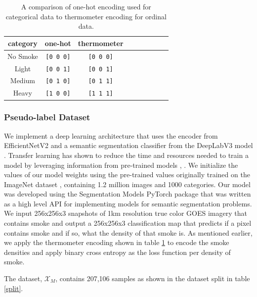 \begin{table}[h] 
    \caption{A comparison of one-hot encoding used for categorical data to thermometer encoding for ordinal data.}\label{therm}
    \centering
    \begin{tabular}{ccccrrcrc}
        \toprule
        category & one-hot & thermometer \\
        \midrule
        No Smoke & \texttt{[0 0 0]} & \texttt{[0 0 0]} \\
        Light  & \texttt{[0 0 1]} & \texttt{[0 0 1]} \\
        Medium & \texttt{[0 1 0]} & \texttt{[0 1 1]} \\
        Heavy  & \texttt{[1 0 0]} & \texttt{[1 1 1]} \\
        \bottomrule
    \end{tabular}
\end{table}

\subsubsection{Pseudo-label Dataset} 

We implement a deep learning architecture that uses the encoder from EfficientNetV2 \cite{efficientnetv2} and a semantic segmentation classifier from the DeepLabV3 model \cite{deeplab}. Transfer learning has shown to reduce the time and resources needed to train a model by leveraging information from pre-trained models \cite{transfer}, \cite{transfer2}. We initialize the values of our model weights using the pre-trained values originally trained on the ImageNet dataset \cite{imgnet}, containing 1.2 million images and 1000 categories. Our model was developed using the Segmentation Models PyTorch package \cite{semantic} that was written as a high level API for implementing models for semantic segmentation problems. We input 256x256x3 snapshots of 1km resolution true color GOES imagery that contains smoke and output a 256x256x3 classification map that predicts if a pixel contains smoke and if so, what the density of that smoke is. As mentioned earlier, we apply the thermometer encoding shown in table \ref{therm} to encode the smoke densities and apply binary cross entropy as the loss function per density of smoke. 

The dataset, \(\mathcal{X}_M\), contains 207,106 samples as shown in the dataset split in table \ref{split}. 

